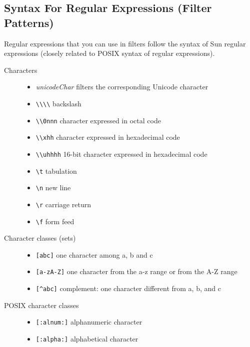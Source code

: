 \subsection{Syntax For Regular Expressions (Filter Patterns)}
Regular expressions that you can use in filters follow the syntax of Sun regular
expressions (closely related to POSIX syntax of regular expressions).
\begin{description}
\item[Characters]
   \mbox{}\begin{itemize}
    \item \textit{unicodeChar} filters the corresponding Unicode character
    \item \verb!\\\\!        backslash
    \item \verb!\\0nnn!      character expressed in octal code
    \item \verb!\\xhh!       character expressed in hexadecimal code
    \item \verb!\\uhhhh!     16-bit character expressed in hexadecimal code
    \item \verb!\t!          tabulation
    \item \verb!\n!          new line
    \item \verb!\r!          carriage return
    \item \verb!\f!          form feed
   \end{itemize}
\item[Character classes (sets)]
    \mbox{}\begin{itemize}
    \item \verb![abc]!                one character among a, b and c
    \item \verb![a-zA-Z]!             one character from the a-z range or from the A-Z range
    \item \verb![^abc]!               complement: one character different from a, b, and c
    \end{itemize}
\item[POSIX character classes]
    \mbox{}\begin{itemize}
    \item \verb![:alnum:]!            alphanumeric character
    \item \verb![:alpha:]!            alphabetical character

\end{itemize}
\end{description}
